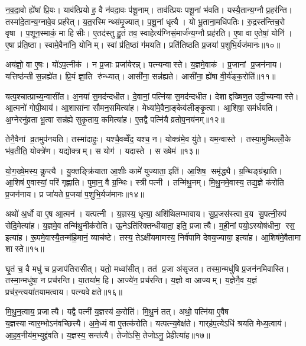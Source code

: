 न॒व॒दा॒वो ह्ये॑षां प्रि॒यः। याव॑त्प्रियो ह॒ वै न॑वदा॒वः प॑शू॒नाम्। ताव॑त्प्रियः पशू॒नां भ॑वति। यस्यै॒तान्य॒ग्नौ प्र॒हर॑न्ति। तस्मा॑दे॒तान्य॒ग्नावे॒व प्रह॑रेत्। य॒त॒रस्मिन्थ्संमृ॒ज्यात्। प॒शू॒नां धृत्यै। यो भू॒ताना॒मधि॑पतिः। रु॒द्रस्त॑न्तिच॒रो वृषा। प॒शून॒स्माकं॒ मा हिसीः। ए॒तद॑स्तु हु॒तं तव॒ स्वाहेत्य॑ग्निसं॒मार्ज॑न्य॒ग्नौ प्रह॑रति। ए॒षा वा ए॒तेषां॒ योनि॑। ए॒षा प्र॑ति॒ष्ठा। स्वामे॒वैना॑नि॒ योनिम्। स्वां प्र॑ति॒ष्ठां ग॑मयति। प्रति॑तिष्ठति प्र॒जया॑ प॒शुभि॒र्यज॑मानः॥१०॥

अय॑ज्ञो॒ वा ए॒षः। यो॑ऽप॒त्नीक॑। न प्र॒जाः प्रजा॑येरन्न्। पत्न्यन्वास्ते। य॒ज्ञमे॒वाक॑। प्र॒जानां प्र॒जन॑नाय। यत्तिष्ठ॑न्ती स॒न्नह्ये॑त। प्रि॒यं ज्ञा॒ति रु॑न्ध्यात्। आसी॑ना॒ सन्न॑ह्यते। आसी॑ना॒ ह्ये॑षा वी॒र्य॑ङ्क॒रोति॑॥११॥

यत्प॒श्चात्प्राच्य॒न्वासी॑त। अ॒नया॑ स॒मद॑न्दधीत। दे॒वानां॒ पत्नि॑या स॒मद॑न्दधीत। देशाद्दख्षिण॒त उदी॒च्यन्वास्ते। आ॒त्मनो॑ गोपी॒थाय॑। आ॒शासा॑ना सौमन॒समित्या॑ह। मेध्या॑मे॒वैना॒ङ्केव॑लीङ्कृ॒त्वा। आ॒शिषा॒ सम॑र्धयति। अ॒ग्नेरनु॑व्रता भू॒त्वा सन्न॑ह्ये सुकृ॒ताय॒ कमित्या॑ह। ए॒तद्वै पत्नि॑यै व्रतोप॒नय॑नम्॥१२॥

तेनै॒वैनां व्र॒तमुप॑नयति। तस्मा॑दाहुः। यश्चै॒वव्वेँद॒ यश्च॒ न। योक्त्र॑मे॒व यु॑ते। यम॒न्वास्ते। तस्या॒मुष्मिल्लोँ॒के भ॑व॒तीति॒ योक्त्रे॑ण। यद्योक्त्रम्। स योग॑। यदास्ते। स ख्षेम॑॥१३॥

यो॒ग॒ख्षे॒मस्य॒ कॢप्त्यै। यु॒क्तङ्क्रि॑याता आ॒शीः कामे॑ युज्याता॒ इति॑। आ॒शिष॒ समृ॑द्ध्यै। ग्र॒न्थिङ्ग्र॑थ्नाति। आ॒शिष॑ ए॒वास्यां॒ परि॑ गृह्णाति। पुमा॒न्॒ वै ग्र॒न्थिः। स्त्री पत्नी। तन्मि॑थु॒नम्। मि॒थु॒नमे॒वास्य॒ तद्य॒ज्ञे क॑रोति प्र॒जन॑नाय। प्र जा॑यते प्र॒जया॑ प॒शुभि॒र्यज॑मानः॥१४॥

अथो॑ अ॒र्धो वा ए॒ष आ॒त्मन॑। यत्पत्नी। य॒ज्ञस्य॒ धृत्या॒ अशि॑थिलम्भावाय। सु॒प्र॒जस॑स्त्वा व॒य सु॒पत्नी॒रुप॑ सेदि॒मेत्या॑ह। य॒ज्ञमे॒व तन्मि॑थु॒नीक॑रोति। ऊ॒नेऽति॑रिक्तन्धीयाता॒ इति॒ प्रजात्यै। म॒ही॒नां पयो॒ऽस्योष॑धीना॒ रस॒ इत्या॑ह। रू॒पमे॒वास्यै॒तन्म॑हि॒मानं॒ व्याच॑ष्टे। तस्य॒ तेऽक्षी॑यमाणस्य॒ निर्व॑पामि देवय॒ज्याया॒ इत्या॑ह। आ॒शिष॑मे॒वैतामा शास्ते॥१५॥\anuvakamend[क॒रोति॑ व्रतोप॒नय॑नं॒ क्षेमो॒ यज॑मानश्शास्ते]

घृ॒तं च॒ वै मधु॑ च प्र॒जाप॑तिरासीत्। यतो॒ मध्वा॑सीत्। तत॑ प्र॒जा अ॑सृजत। तस्मा॒न्मधु॑षि प्र॒जन॑नमिवास्ति। तस्मा॒न्मधु॑षा॒ न प्रच॑रन्ति। या॒तया॑म॒ हि। आज्ये॑न॒ प्रच॑रन्ति। य॒ज्ञो वा आज्यम्। य॒ज्ञेनै॒व य॒ज्ञं प्रच॑र॒न्त्यया॑तयामत्वाय। पत्न्यवेक्षते॥१६॥

मि॒थु॒न॒त्वाय॒ प्रजात्यै। यद्वै पत्नी॑ य॒ज्ञस्य॑ क॒रोति॑। मि॒थु॒नं तत्। अथो॒ पत्नि॑या ए॒वैष य॒ज्ञस्यान्वार॒म्भोऽन॑वच्छित्त्यै। अ॒मे॒ध्यं वा ए॒तत्क॑रोति। यत्पत्न्य॒वेक्ष॑ते। गार्‌ह॑प॒त्येऽधि॑ श्रयति मेध्य॒त्वाय॑। आ॒ह॒व॒नीय॑म॒भ्युद्द्र॑वति। य॒ज्ञस्य॒ सन्त॑त्यै। तेजो॑ऽसि॒ तेजोऽनु॒ प्रेहीत्या॑ह॥१७॥

